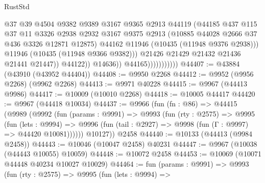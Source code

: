 \begin{lexlean}{RustStd}
\begin{coremodule}
                                        @37
                                        @39
                                        @4504
                                        @9382
                                        @9389
                                        @3167
                                        @9365
                                        @2913
                                        @44119
                                        (@44185
                                          @437
                                          @115
                                          @37
                                          @11
                                          @3326
                                          @2938
                                          @2932
                                          @3167
                                          @9375
                                          @2913
                                          (@10885 @44028 @2666 @37 @436 @3326 @12871 @12875)
                                          @44162
                                          @11946
                                          (@10435 (@11948 @9376 @2938)))
                                        @11946
                                        (@10435 (@11948 @9366 @9382)))
                                      @21426
                                      @21429
                                      @21432
                                      @21436
                                      @21441
                                      @21447))
                                  @44122))
                              @14636))
                          @44165)))))))))))
@44407 := @43884 (@43910 (@43952 @44404))
@44408 := @9950 @2268
@44412 := @9952 (@9956 @2268) (@9962 @2268)
@44413 := @9971 @40228
@44415 := @9967 (@44413 @9986)
@44417 := @10009 (@10010 @2268)
@44418 := @10005 @44417
@44420 := @9967 (@44418 @10034)
@44437 := @9966
    (fun (fn : @86) =>
    @44415
      (@9989
        (@9992
          (fun (params : @9991) =>
          @9993
            (fun (rty : @2575) =>
            @9995
              (fun (lets : @9994) =>
              @9996 (fun (tail : @2927) => @9998 (fun (Γ : @9997) => @44420 @10081))))))
        @10127))
    @2458
@44440 := @10133 (@44413 (@9984 @2458))
@44443 := @10046 (@10047 @2458) @40231
@44447 := @9967 (@10038 (@44443 @10055) @10059)
@44448 := @10072 @2458
@44453 := @10069 (@10071 @44448 @40234 @10027 @10029)
@44464 := fun (params : @9991) =>
  @9993
    (fun (rty : @2575) =>
    @9995
      (fun (lets : @9994) =>

\end{coremodule}
\end{lexlean}
